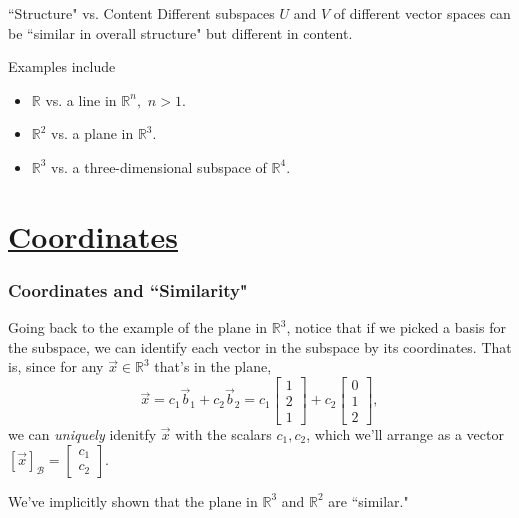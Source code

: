 \documentclass{beamer}
\begin{document}
\begin{frame}
	\begin{alertblock}{``Structure" vs. Content}
		Different subspaces \(U\) and \(V\) of different vector spaces can be ``similar in overall structure" but different in content.
	\end{alertblock}
	Examples include
		\begin{itemize}
			\item<2-> \(\mathbb{R}\) vs.\! a line in \(\mathbb{R}^n,\) \(n > 1\).
			\item<3-> \(\mathbb{R}^2\) vs.\! a plane in \(\mathbb{R}^3\).
			\item<4-> \(\mathbb{R}^3\) vs.\! a three-dimensional subspace of \(\mathbb{R}^4\).
		\end{itemize}
	
\end{frame}


\section{\href{https://www.geogebra.org/m/v9dyypp9}{Coordinates}}
\begin{frame}
	\frametitle{Coordinates and ``Similarity"}
	Going back to the example of the plane in \(\mathbb{R}^3\), notice that if we picked a basis for the subspace, we can identify each vector in the subspace by its 
	coordinates. That is, since for any \(\vec{x} \in \mathbb{R}^3\) that's in the plane, 
	\[\vec{x} = c_ 1\vec{b}_1 + c_2\vec{b}_2 = c_1\begin{bmatrix}1 \\ 2 \\ 1\end{bmatrix} + c_2\begin{bmatrix}0 \\ 1 \\ 2\end{bmatrix},\]
	we can \emph{uniquely} idenitfy \(\vec{x}\) with the scalars \(c_1, c_2\), which we'll arrange as a vector \([\vec{x}]_{\mathcal{B}} =\begin{bmatrix}c_1 \\ c_2\end{bmatrix}.\) 

	We've implicitly shown that the plane in \(\mathbb{R}^3\) and \(\mathbb{R}^2\) are ``similar." 
\end{frame}
\end{document}
